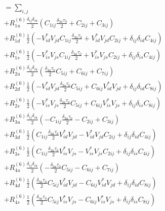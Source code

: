 \begin{align*}
	&= \sum_{i,j} \\
	&+ R_{1u}^{(6)}\frac{\delta_{ij}\delta_{iu}}{2}\left(C_{1ij}\frac{\delta_{3a}\tau_{0}}{2}+ 
	C_{2ij} + C_{3ij}\right) \\
	&+ R_{1d}^{(6)}\frac{1}{2}\left(- V_{id}^*V_{jd}C_{1ij}\frac{\delta_{3a}\tau_{0}}{2}+ V_{id}^*V_{jd}C_{2ij}+ \delta_{ij}\delta_{id}C_{4ij}\right) \\
	&+ R_{1s}^{(6)}\frac{1}{2}\left(- V_{is}^*V_{js}C_{1ij}\frac{\delta_{3a}\tau_{0}}{2}+ V_{is}^*V_{js}C_{2ij}+ \delta_{ij}\delta_{is}C_{4ij}\right) \\
	&+ R_{2u}^{(6)}\frac{\delta_{ij}\delta_{iu}}{2}\left(\frac{\delta_{3a}\tau_{0}}{2}C_{5ij}+ 
	C_{6ij} + C_{7ij}\right) \\
	&+ R_{2d}^{(6)}\frac{1}{2}\left(- V_{id}^*V_{jd}\frac{\delta_{3a}\tau_{0}}{2}C_{5ij} + C_{6ij}V_{id}^*V_{jd} + \delta_{ij}\delta_{id}C_{8ij}\right) \\
	&+ R_{2s}^{(6)}\frac{1}{2}\left(- V_{is}^*V_{js}\frac{\delta_{3a}\tau_{0}}{2}C_{5ij} + C_{6ij}V_{is}^*V_{js} + \delta_{ij}\delta_{is}C_{8ij}\right) \\
	&+ R_{3u}^{(6)}\frac{\delta_{ij}\delta_{iu}}{2}\left(- C_{1ij}\frac{\delta_{3a}\tau_{0}}{2} - C_{2ij} + C_{3ij}\right) \\
	&+ R_{3d}^{(6)}\frac{1}{2}\left(C_{1ij}\frac{\delta_{3a}\tau_{0}}{2} V_{id}^*V_{jd} - V_{id}^*V_{jd}C_{2ij} + \delta_{ij}\delta_{id}C_{4ij}\right) \\
	&+ R_{3s}^{(6)}\frac{1}{2}\left(C_{1ij}\frac{\delta_{3a}\tau_{0}}{2} V_{is}^*V_{js} - V_{is}^*V_{js}C_{2ij} + \delta_{ij}\delta_{is}C_{4ij}\right) \\
	&+ R_{4u}^{(6)}\frac{\delta_{ij}\delta_{iu}}{2}\left(-\frac{\delta_{3a}\tau_{0}}{2}C_{5ij} - C_{6ij} + C_{7ij}\right) \\
	&+ R_{4d}^{(6)}\frac{1}{2}\left(\frac{\delta_{3a}\tau_{0}}{2}C_{5ij}V_{id}^*V_{jd} - C_{6ij}V_{id}^*V_{jd} + \delta_{ij}\delta_{id}C_{8ij}\right) \\
	&+ R_{4s}^{(6)}\frac{1}{2}\left(\frac{\delta_{3a}\tau_{0}}{2}C_{5ij}V_{is}^*V_{js} - C_{6ij}V_{is}^*V_{js} + \delta_{ij}\delta_{is}C_{8ij}\right) \\	
\end{align*}